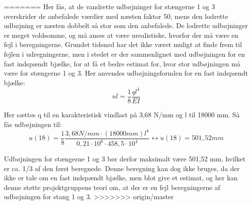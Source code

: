 =======
Her fås, at de vandrette udbøjninger for stængerne 1 og 3 overskrider de anbefalede værdier med næsten faktor 50, mens den lodrette udbøjning er næsten dobbelt så stor som den anbefalede. De lodrette udbøjninger er meget voldsomme, og må anses at være urealistiske, hvorfor der må være en fejl i beregningerne. Grundet tidsnød har det ikke været muligt at finde frem til fejlen i udregningerne, men i stedet er der sammenlignet med udbøjningen for en fast indspændt bjælke, for at få et bedre estimat for, hvor stor udbøjningen må være for stængerne 1 og 3. 
\newline \indent{     }  Her anvendes udbøjningsformlen for en fast indspændt bjælke:
\begin{equation}
u{l}=\frac{1}{8} \frac{ql^4}{EI}
\end{equation}

Her sættes q til en karakteristisk vindlast på 3,68 N/mm og l til 18000 mm. Så fås udbøjningen til: 
\begin{equation}
u(18) = \frac{1}{8} \frac{3,\!68 N/mm \cdot (18000mm)l^4}{0,21 \cdot 10^6 \cdot 458,5 \cdot 10^4} \leftrightarrow u(18) = 501,52 mm
\end{equation}

Udbøjningen for stængerne 1 og 3 bør derfor maksimalt være 501,52 mm, hvilket er ca. 1/3 af den først beregnede. Denne beregning kan dog ikke bruges, da der ikke er tale om en fast indspændt bjælke, men blot give et estimat, og her kan denne støtte projektgruppens teori om, at der er en fejl beregningerne af udbøjningen for stang 1 og 3.
>>>>>>> origin/master
